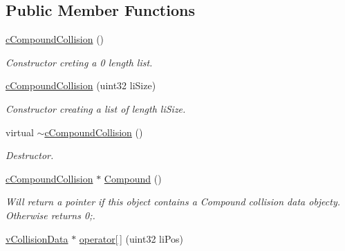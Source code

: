 \subsection*{Public Member Functions}
\begin{DoxyCompactItemize}
\item 
\hypertarget{classc_compound_collision_a6b8a94a617eb5198133d0759aeb3de02}{
\hyperlink{classc_compound_collision_a6b8a94a617eb5198133d0759aeb3de02}{cCompoundCollision} ()}
\label{classc_compound_collision_a6b8a94a617eb5198133d0759aeb3de02}

\begin{DoxyCompactList}\small\item\em Constructor creting a 0 length list. \end{DoxyCompactList}\item 
\hypertarget{classc_compound_collision_a8769934e6b4193ad31663288f8f55d0a}{
\hyperlink{classc_compound_collision_a8769934e6b4193ad31663288f8f55d0a}{cCompoundCollision} (uint32 liSize)}
\label{classc_compound_collision_a8769934e6b4193ad31663288f8f55d0a}

\begin{DoxyCompactList}\small\item\em Constructor creating a list of length liSize. \end{DoxyCompactList}\item 
\hypertarget{classc_compound_collision_ac95481f434fe511808ed362139442056}{
virtual \hyperlink{classc_compound_collision_ac95481f434fe511808ed362139442056}{$\sim$cCompoundCollision} ()}
\label{classc_compound_collision_ac95481f434fe511808ed362139442056}

\begin{DoxyCompactList}\small\item\em Destructor. \end{DoxyCompactList}\item 
\hypertarget{classc_compound_collision_ad54119082da305da69cce7c9b58e7135}{
\hyperlink{classc_compound_collision}{cCompoundCollision} $\ast$ \hyperlink{classc_compound_collision_ad54119082da305da69cce7c9b58e7135}{Compound} ()}
\label{classc_compound_collision_ad54119082da305da69cce7c9b58e7135}

\begin{DoxyCompactList}\small\item\em Will return a pointer if this object contains a Compound collision data objecty. Otherwise returns 0;. \end{DoxyCompactList}\item 
\hypertarget{classc_compound_collision_a0f0b6cd5120d20e6ad65a5ba2b27fc97}{
\hyperlink{classv_collision_data}{vCollisionData} $\ast$ \hyperlink{classc_compound_collision_a0f0b6cd5120d20e6ad65a5ba2b27fc97}{operator\mbox{[}$\,$\mbox{]}} (uint32 liPos)}
\label{classc_compound_collision_a0f0b6cd5120d20e6ad65a5ba2b27fc97}


\end{DoxyCompactItemize}
